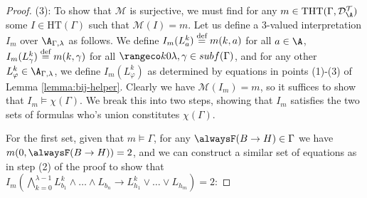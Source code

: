 \begin{proof}
  (3): To show that $\mathcal{M}$ is surjective, we must find for any
  $m \in \text{THT}(\Gamma,\langdat)$ some $I \in \text{HT}(\Gamma)$
  such that $\mathcal{M}(I) = m$. Let us define a 3-valued
  interpretation $I_m$ over $\A_{\Gamma,\lambda}$ as follows. We
  define $I_m(L_{a}^k) \stackrel{\text{def}}{=} m(k,a)$ for all $a \in \A$,
  $I_m(L^k_{\gamma}) \stackrel{\text{def}}{=} m(k,\gamma)$ for all
  $\kinlambda, \gamma \in subf(\Gamma)$, and for any other
  $L^k_\varphi \in \A_{\Gamma,\lambda}$, we define
  $I_m(L^k_{\varphi})$ as determined by equations in points (1)-(3) of
  Lemma \ref{lemma:bij-helper}. Clearly we have
  $\mathcal{M}(I_m) = m$, so it suffices to show that
  $I_m \models \chi(\Gamma)$. We break this into two steps, showing
  that $I_m$ satisfies the two sets of formulas who's union
  constitutes $\chi(\Gamma)$.

  For the first set, given that $m \models \Gamma$, for any
  $\tempruleshort \in \Gamma$ we have $m(0,\tempruleshort)=2$, and we
  can construct a similar set of equations as in step (2) of the proof
  to show that
  $I_m(\bigwedge_{k=0}^{\lambda-1} L_{b_1}^k \land \dots \land L_{b_n}
  \rightarrow L_{h_1}^k \lor \dots \lor L_{h_m}) = 2$:


\end{proof}
